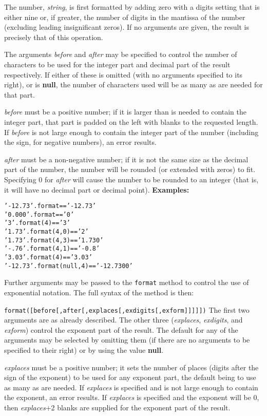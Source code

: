 \begin{description}
The number, \emph{string}, is first formatted by adding zero with a
digits setting that is either nine or, if greater, the number of digits
in the mantissa of the number (excluding leading insignificant zeros).
If no arguments are given, the result is precisely that of this
operation.
 
The arguments \emph{before} and \emph{after} may be specified to
control the number of characters to be used for the integer part and
decimal part of the result respectively.  If either of these is omitted
(with no arguments specified to its right), or is \textbf{null}, the
number of characters used will be as many as are needed for that part.
 
\emph{before} must be a positive number; if it is larger than is
needed to contain the integer part, that part is padded on the left with
blanks to the requested length.
If \emph{before} is not large enough to contain the integer part
of the number (including the sign, for negative numbers), an error
results.
 
\emph{after} must be a non-negative number; if it is not the same
size as the decimal part of the number, the number will be rounded (or
extended with zeros) to fit.  Specifying 0 for \emph{after} will
cause the number to be rounded to an integer (that is, it will have no
decimal part or decimal point).
 \textbf{Examples:}
\begin{alltt}
' - 12.73'.format         == '-12.73'
'0.000'.format            == '0'
'3'.format(4)             == '   3'
'1.73'.format(4,0)        == '   2'
'1.73'.format(4,3)        == '   1.730'
'-.76'.format(4,1)        == '  -0.8'
'3.03'.format(4)          == '   3.03'
' - 12.73'.format(null,4) == '-12.7300'
\end{alltt}
 
Further arguments may be passed to the \texttt{format} method to control
the use of exponential notation.
The full syntax of the method is then:
 
\texttt{format([before[,after[,explaces[,exdigits[,exform]]]]])}
 The first two arguments are as already described.  The other three
(\emph{explaces}, \emph{exdigits}, and \emph{exform})
control the exponent part of the result.  The default for any of the
arguments may be selected by omitting them (if there are no arguments to
be specified to their right) or by using the value \textbf{null}.
 
\emph{explaces} must be a positive number; it sets the number of
places (digits after the sign of the exponent) to be used for any
exponent part, the default being to use as many as are needed.
If \emph{explaces} is specified and is not large enough to contain
the exponent, an error results.
If \emph{explaces} is specified and the exponent will be 0,
then \emph{explaces}+2 blanks are supplied for the exponent
part of the result.
 

\end{description}
